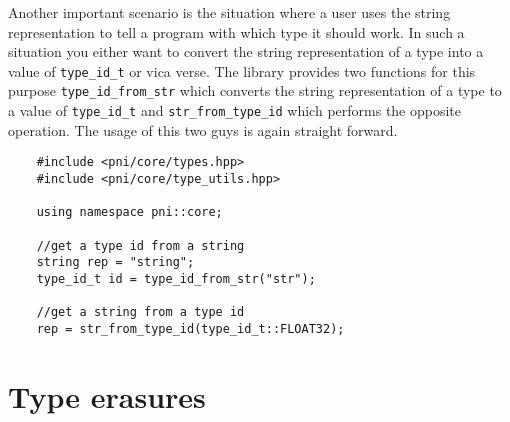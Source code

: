 Another important scenario is the situation where a user uses the string
representation to tell a program with which type it should work. 
In such a situation you either want to convert the string representation of a
type into a value of {\tt type\_id\_t} or vica verse. The library provides two
functions for this purpose {\tt type\_id\_from\_str} which converts the string
representation of a type to a value of {\tt type\_id\_t} and 
{\tt str\_from\_type\_id} which performs the opposite operation. 
The usage of this two guys is again straight forward.
\begin{verbatim}
    #include <pni/core/types.hpp>
    #include <pni/core/type_utils.hpp>

    using namespace pni::core;

    //get a type id from a string
    string rep = "string";
    type_id_t id = type_id_from_str("str");

    //get a string from a type id
    rep = str_from_type_id(type_id_t::FLOAT32);
\end{verbatim}


\section{Type erasures}

